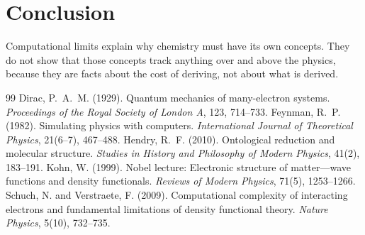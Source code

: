 \documentclass{situationist-preprint}
\begin{document}
\section{Conclusion}

Computational limits explain why chemistry must have its own concepts. They do not show that those concepts track anything over and above the physics, because they are facts about the cost of deriving, not about what is derived.

\begin{thebibliography}{99}\small
{} Dirac, P.~A.~M. (1929). Quantum mechanics of many-electron systems. \emph{Proceedings of the Royal Society of London A}, 123, 714--733.
 Feynman, R.~P. (1982). Simulating physics with computers. \emph{International Journal of Theoretical Physics}, 21(6--7), 467--488.
 Hendry, R.~F. (2010). Ontological reduction and molecular structure. \emph{Studies in History and Philosophy of Modern Physics}, 41(2), 183--191.
 Kohn, W. (1999). Nobel lecture: Electronic structure of matter---wave functions and density functionals. \emph{Reviews of Modern Physics}, 71(5), 1253--1266.
 Schuch, N. and Verstraete, F. (2009). Computational complexity of interacting electrons and fundamental limitations of density functional theory. \emph{Nature Physics}, 5(10), 732--735.
\end{thebibliography}
\end{document}
